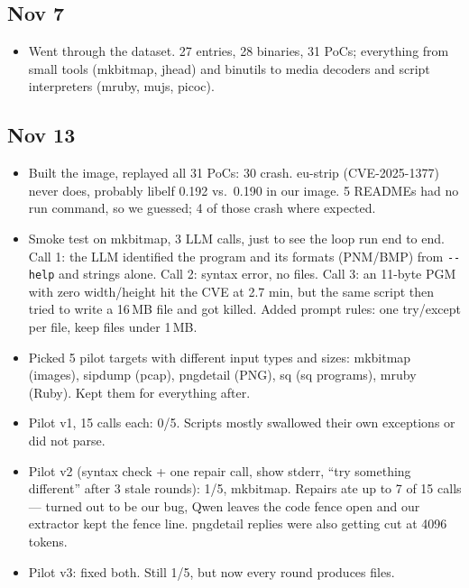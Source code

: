 \documentclass[10pt]{article}
\begin{document}
\subsection*{Nov 7}
\begin{itemize}
\item Went through the dataset. 27 entries, 28 binaries, 31 PoCs; everything from small tools
(mkbitmap, jhead) and binutils to media decoders and script interpreters (mruby, mujs, picoc).
\end{itemize}

\subsection*{Nov 13}
\begin{itemize}
\item Built the image, replayed all 31 PoCs: 30 crash. eu-strip (CVE-2025-1377) never does,
probably libelf 0.192 vs.\ 0.190 in our image. 5 READMEs had no run command, so we guessed;
4 of those crash where expected.
\item Smoke test on mkbitmap, 3 LLM calls, just to see the loop run end to end. Call 1: the LLM
identified the program and its formats (PNM/BMP) from \texttt{-{}-help} and strings alone.
Call 2: syntax error, no files. Call 3: an 11-byte PGM with zero width/height hit the CVE at
2.7 min, but the same script then tried to write a 16\,MB file and got killed. Added prompt
rules: one try/except per file, keep files under 1\,MB.
\item Picked 5 pilot targets with different input types and sizes: mkbitmap (images), sipdump
(pcap), pngdetail (PNG), sq (sq programs), mruby (Ruby). Kept them for everything after.
\item Pilot v1, 15 calls each: 0/5. Scripts mostly swallowed their own exceptions or did not
parse.
\item Pilot v2 (syntax check + one repair call, show stderr, ``try something different'' after
3 stale rounds): 1/5, mkbitmap. Repairs ate up to 7 of 15 calls --- turned out to be our bug,
Qwen leaves the code fence open and our extractor kept the fence line. pngdetail replies were
also getting cut at 4096 tokens.
\item Pilot v3: fixed both. Still 1/5, but now every round produces files.
\end{itemize}
\end{document}
